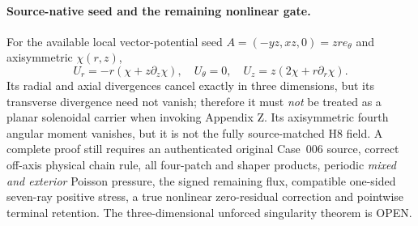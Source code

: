 \paragraph{Source-native seed and the remaining nonlinear gate.}
For the available local vector-potential seed $A=(-yz,xz,0)=zr e_\theta$ and axisymmetric $\chi(r,z)$,
\[
U_r=-r(\chi+z\partial_z\chi),\quad U_\theta=0,\quad
U_z=z(2\chi+r\partial_r\chi).
\]
Its radial and axial divergences cancel exactly in three dimensions, but its transverse divergence need not vanish; therefore it must \emph{not} be treated as a planar solenoidal carrier when invoking Appendix Z. Its axisymmetric fourth angular moment vanishes, but it is not the fully source-matched H8 field.
A complete proof still requires an authenticated original Case~006 source, correct off-axis physical chain rule, all four-patch and shaper products, periodic \emph{mixed and exterior} Poisson pressure, the signed remaining flux, compatible one-sided seven-ray positive stress, a true nonlinear zero-residual correction and pointwise terminal retention. The three-dimensional unforced singularity theorem is OPEN.
